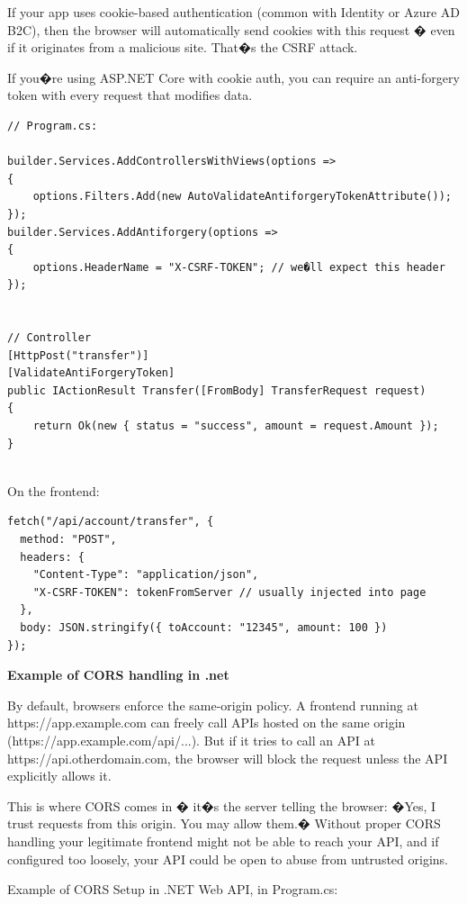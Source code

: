 If your app uses cookie-based authentication (common with Identity or Azure AD B2C), then the browser will automatically send cookies with this request � even if it originates from a malicious site. That�s the CSRF attack.

If you�re using ASP.NET Core with cookie auth, you can require an anti-forgery token with every request that modifies data.

\begin{lstlisting}
// Program.cs:

builder.Services.AddControllersWithViews(options =>
{
    options.Filters.Add(new AutoValidateAntiforgeryTokenAttribute());
});
builder.Services.AddAntiforgery(options =>
{
    options.HeaderName = "X-CSRF-TOKEN"; // we�ll expect this header
});


// Controller
[HttpPost("transfer")]
[ValidateAntiForgeryToken]
public IActionResult Transfer([FromBody] TransferRequest request)
{
    return Ok(new { status = "success", amount = request.Amount });
}


\end{lstlisting}

On the frontend:

\begin{lstlisting}
fetch("/api/account/transfer", {
  method: "POST",
  headers: {
    "Content-Type": "application/json",
    "X-CSRF-TOKEN": tokenFromServer // usually injected into page
  },
  body: JSON.stringify({ toAccount: "12345", amount: 100 })
});

\end{lstlisting}

\textbf{Example of CORS handling in .net}

By default, browsers enforce the same-origin policy. A frontend running at https://app.example.com can freely call APIs hosted on the same origin (https://app.example.com/api/...). But if it tries to call an API at https://api.otherdomain.com, the browser will block the request unless the API explicitly allows it.

This is where CORS comes in � it�s the server telling the browser: �Yes, I trust requests from this origin. You may allow them.� Without proper CORS handling your legitimate frontend might not be able to reach your API, and if configured too loosely, your API could be open to abuse from untrusted origins.

Example of CORS Setup in .NET Web API, in Program.cs:

